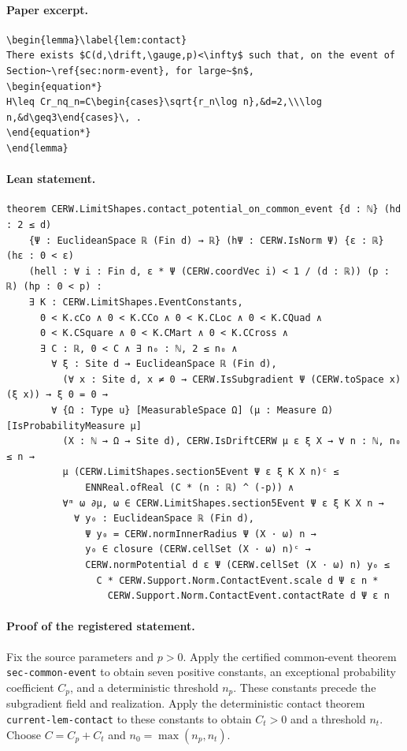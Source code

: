 \paragraph{Paper excerpt.}
\begin{verbatim}
\begin{lemma}\label{lem:contact}
There exists $C(d,\drift,\gauge,p)<\infty$ such that, on the event of Section~\ref{sec:norm-event}, for large~$n$,
\begin{equation*}
H\leq Cr_nq_n=C\begin{cases}\sqrt{r_n\log n},&d=2,\\\log n,&d\geq3\end{cases}\, .
\end{equation*}
\end{lemma}
\end{verbatim}
\paragraph{Lean statement.}
\begin{verbatim}
theorem CERW.LimitShapes.contact_potential_on_common_event {d : ℕ} (hd : 2 ≤ d)
    {Ψ : EuclideanSpace ℝ (Fin d) → ℝ} (hΨ : CERW.IsNorm Ψ) {ε : ℝ} (hε : 0 < ε)
    (hell : ∀ i : Fin d, ε * Ψ (CERW.coordVec i) < 1 / (d : ℝ)) (p : ℝ) (hp : 0 < p) :
    ∃ K : CERW.LimitShapes.EventConstants,
      0 < K.cCo ∧ 0 < K.CCo ∧ 0 < K.CLoc ∧ 0 < K.CQuad ∧
      0 < K.CSquare ∧ 0 < K.CMart ∧ 0 < K.CCross ∧
      ∃ C : ℝ, 0 < C ∧ ∃ n₀ : ℕ, 2 ≤ n₀ ∧
        ∀ ξ : Site d → EuclideanSpace ℝ (Fin d),
          (∀ x : Site d, x ≠ 0 → CERW.IsSubgradient Ψ (CERW.toSpace x) (ξ x)) → ξ 0 = 0 →
        ∀ {Ω : Type u} [MeasurableSpace Ω] (μ : Measure Ω) [IsProbabilityMeasure μ]
          (X : ℕ → Ω → Site d), CERW.IsDriftCERW μ ε ξ X → ∀ n : ℕ, n₀ ≤ n →
          μ (CERW.LimitShapes.section5Event Ψ ε ξ K X n)ᶜ ≤
              ENNReal.ofReal (C * (n : ℝ) ^ (-p)) ∧
          ∀ᵐ ω ∂μ, ω ∈ CERW.LimitShapes.section5Event Ψ ε ξ K X n →
            ∀ y₀ : EuclideanSpace ℝ (Fin d),
              Ψ y₀ = CERW.normInnerRadius Ψ (X · ω) n →
              y₀ ∈ closure (CERW.cellSet (X · ω) n)ᶜ →
              CERW.normPotential d ε Ψ (CERW.cellSet (X · ω) n) y₀ ≤
                C * CERW.Support.Norm.ContactEvent.scale d Ψ ε n *
                  CERW.Support.Norm.ContactEvent.contactRate d Ψ ε n
\end{verbatim}
\paragraph{Proof of the registered statement.}
Fix the source parameters and $p>0$. Apply the certified common-event theorem
\texttt{sec-common-event} to obtain seven positive constants, an exceptional
probability coefficient $C_p$, and a deterministic threshold $n_p$.
These constants precede the subgradient field and realization.
Apply the deterministic contact theorem \texttt{current-lem-contact}
to these constants to obtain $C_t>0$ and a threshold $n_t$.
Choose $C=C_p+C_t$ and $n_0=\max(n_p,n_t)$.

